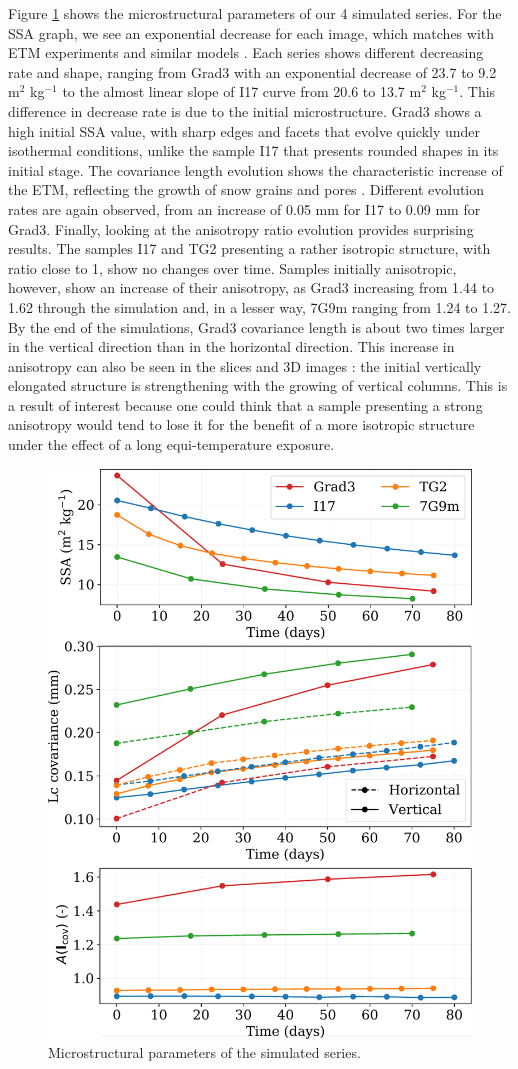\documentclass[draft,ms]{agujournal2019}
\begin{document}
Figure \ref{fig:4_images_microstruct} shows the microstructural parameters of our 4 simulated series. For the SSA graph, we see an exponential decrease for each image, which matches with ETM experiments and similar models \cite{vetter_simulating_2010, kaempfer_observation_2007}. Each series shows different decreasing rate and shape, ranging from Grad3 with an exponential decrease of 23.7 to 9.2 m$^2$ kg$^{-1}$ to the almost linear slope of I17 curve from 20.6 to 13.7 m$^2$ kg$^{-1}$. This difference in decrease rate  is due to the initial microstructure. Grad3 shows a high initial SSA value, with sharp edges and facets that evolve quickly under isothermal conditions, unlike the sample I17 that presents rounded shapes in its initial stage.
The covariance length evolution shows the characteristic increase of the ETM, reflecting the growth of snow grains and pores \cite{lowe2011interfacial, calonne_study_2014}. Different evolution rates are again observed, from an increase of 0.05 mm for I17 to 0.09 mm for Grad3. Finally, looking at the anisotropy ratio evolution provides surprising results. The samples I17 and TG2 presenting a rather isotropic structure, with ratio close to 1, show no changes over time. Samples initially anisotropic, however, show an increase of their anisotropy, as Grad3 increasing from 1.44 to 1.62 through the simulation and, in a lesser way, 7G9m ranging from 1.24 to 1.27. By the end of the simulations, Grad3 covariance length is about two times larger in the vertical direction than in the horizontal direction. This increase in anisotropy can also be seen in the slices and 3D images : the initial vertically elongated structure is strengthening with the growing of vertical columns. This is a result of interest because one could think that a sample presenting a strong anisotropy would tend to lose it for the benefit of a more isotropic structure under the effect of a long equi-temperature exposure.

\begin{figure}
    \centering
    \includegraphics[width=0.6\linewidth]{Figures/4_images_microstructure.pdf}
    \caption{Microstructural parameters of the simulated series.}
    \label{fig:4_images_microstruct}
\end{figure}
\end{document}
